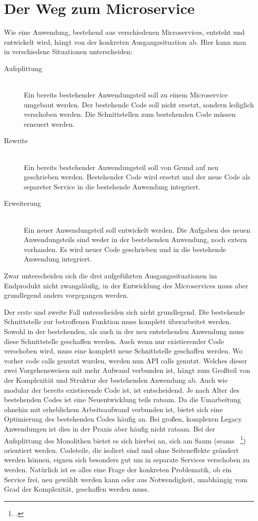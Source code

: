\section{Der Weg zum Microservice}
Wie eine Anwendung, bestehend aus verschiedenen Microservices, entsteht und entwickelt wird, hängt von der konkreten Ausgangssituation ab. Hier kann man in verschiedene Situationen unterscheiden:
\begin{description}
  \item[Aufsplittung] \hfill \\
  Ein bereits bestehender Anwendungsteil soll zu einem Microservice umgebaut werden. Der bestehende Code soll nicht ersetzt, sondern lediglich verschoben werden. Die Schnittstellen zum bestehenden Code müssen erneuert werden.
  \item[Rewrite] \hfill \\
  Ein bereits bestehender Anwendungsteil soll von Grund auf neu geschrieben werden. Bestehender Code wird ersetzt und der neue Code als separeter Service in die bestehende Anwendung integriert.
  \item[Erweiterung] \hfill \\
  Ein neuer Anwendungsteil soll entwickelt werden. Die Aufgaben des neuen Anwendungsteils sind weder in der bestehenden Anwendung, noch extern vorhanden. Es wird neuer Code geschrieben und in die bestehende Anwendung integriert.
\end{description}
Zwar unterscheiden sich die drei aufgeführten Ausgangssituationen im Endprodukt nicht zwangsläufig, in der Entwicklung des Microservices muss aber grundlegend anders vorgegangen werden. 

Der erste und zweite Fall unterscheiden sich nicht grundlegend. Die bestehende Schnittstelle zur betroffenen Funktion muss komplett überarbeitet werden. Sowohl in der bestehenden, als auch in der neu entstehenden Anwendung muss diese Schnittstelle geschaffen werden. Auch wenn nur existierender Code verschoben wird, muss eine komplett neue Schnittstelle geschaffen werden. Wo vorher code calls genutzt wurden, werden nun API calls genutzt.
Welches dieser zwei Vorgehensweisen mit mehr Aufwand verbunden ist, hängt zum Großteil von der Komplexität und Struktur der bestehenden Anwendung ab. Auch wie modular der bereits existierende Code ist, ist entscheidend. Je nach Alter des bestehenden Codes ist eine Neuentwicklung teils ratsam. Da die Umarbeitung ohnehin mit erheblichem Arbeitsaufwand verbunden ist, bietet sich eine Optimierung des bestehenden Codes häufig an. Bei großen, komplexen Legacy Anwendungen ist dies in der Praxis aber häufig nicht ratsam.
Bei der Aufsplittung des Monolithen bietet es sich hierbei an, sich am Saum (seams ~\footcite[vgl.][Seite 29 ff.]{feathers2004working}) orientiert werden. Codeteile, die isoliert sind und ohne Seiteneffekte geändert werden können, eignen sich besonders gut um in separate Services verschoben zu werden. Natürlich ist es alles eine Frage der konkreten Problematik, ob ein Service frei, neu gewählt werden kann oder aus Notwendigkeit, unabhängig vom Grad der Komplexität, geschaffen werden muss.


